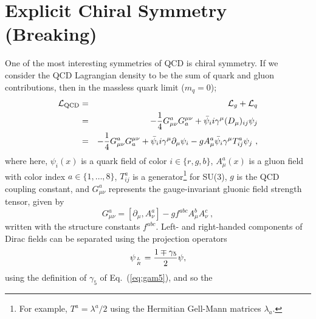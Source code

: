 \documentclass[11pt,a4paper,twoside]{carrollthesis}
\newcommand{\be}{\begin{equation}}
\newcommand{\ee}{\end{equation}}
\newcommand{\del}{\partial}
\newcommand{\bea}{\begin{eqnarray}}
\newcommand{\eea}{\end{eqnarray}}
\newcommand{\reci}[1]{\frac{1}{#1}}
\begin{document}
\section{Explicit Chiral Symmetry (Breaking)}\label{sec:chiral}
%
One of the most interesting symmetries of QCD is chiral symmetry. If
we consider the QCD Lagrangian density to be the sum of quark and
gluon contributions, then in the massless quark limit ($m_q = 0$);
%
%
%
\bea
\nonumber
{\cal L}_{\rm QCD} &=& {\cal L}_g + {\cal L}_q \\
\nonumber
&=& -\reci{4}G_{\mu\nu}^aG_{a}^{\mu\nu}
+ \bar{\psi}_i i \gamma^\mu (D_\mu)_{ij} \psi_j
\\
\label{eq:QCDm0lag}
&=& -\reci{4}G_{\mu\nu}^aG_{a}^{\mu\nu} +
\bar{\psi}_i i\gamma^\mu\del_\mu \psi_i -
gA^a_\mu\bar{\psi}_i\gamma^\mu T_{ij}^a\psi_j\ , \eea 
where here, $\psi_i(x)$ is a quark field of color $i \in \{r,g,b\}$,
$A_\mu^a(x)$ is a gluon field with color index $a \in \{1,\ldots,8\}$,
$T_{ij}^a$ is a generator\footnote{For example, $T^a = \lambda^a/2$
  using the Hermitian Gell-Mann matrices $\lambda_a$.} for SU(3), $g$
is the QCD coupling constant, and $G_{\mu\nu}^a$ represents the
gauge-invariant gluonic field strength tensor, given by
%
\be
G_{\mu\nu}^a = \left[\del_\mu,A_\nu^a\right] - gf^{abc}A_\mu^b
A_\nu^c\ ,
\ee
%
written with the structure constants $f^{abc}$.
%
Left- and right-handed components of Dirac fields can be
separated using the projection operators
%
\be \psi_{L\atop R} = \frac{1\mp \gamma_5}{2}\psi, \ee
%
using the definition of $\gamma_5$ of Eq.~(\ref{eq:gam5}), and so the
\end{document}
